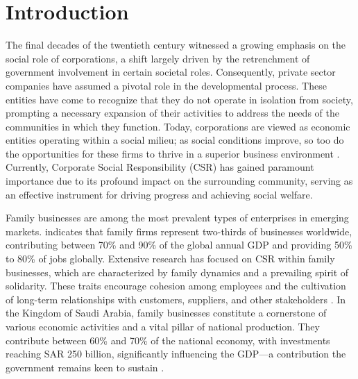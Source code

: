 \documentclass[10pt]{NSP1}
\begin{document}

\maketitle

\section{Introduction}

The final decades of the twentieth century witnessed a growing emphasis on the social role of corporations, a shift largely driven by the retrenchment of government involvement in certain societal roles. Consequently, private sector companies have assumed a pivotal role in the developmental process. These entities have come to recognize that they do not operate in isolation from society, prompting a necessary expansion of their activities to address the needs of the communities in which they function. Today, corporations are viewed as economic entities operating within a social milieu; as social conditions improve, so too do the opportunities for these firms to thrive in a superior business environment \cite{AbdelHalim2018}. Currently, Corporate Social Responsibility (CSR) has gained paramount importance due to its profound impact on the surrounding community, serving as an effective instrument for driving progress and achieving social welfare.

Family businesses are among the most prevalent types of enterprises in emerging markets. \cite{Qarsham2023} indicates that family firms represent two-thirds of businesses worldwide, contributing between 70\% and 90\% of the global annual GDP and providing 50\% to 80\% of jobs globally. Extensive research has focused on CSR within family businesses, which are characterized by family dynamics and a prevailing spirit of solidarity. These traits encourage cohesion among employees and the cultivation of long-term relationships with customers, suppliers, and other stakeholders \cite{Ali2023}. In the Kingdom of Saudi Arabia, family businesses constitute a cornerstone of various economic activities and a vital pillar of national production. They contribute between 60\% and 70\% of the national economy, with investments reaching SAR 250 billion, significantly influencing the GDP—a contribution the government remains keen to sustain \cite{AlMuqaddam2024}.
\end{document}
